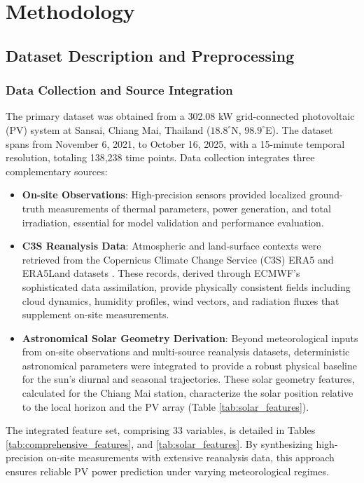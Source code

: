 \documentclass[conference]{IEEEtran}
\begin{document}
	
	
	\section{Methodology}
	
	\subsection{Dataset Description and Preprocessing}
	
	\subsubsection{\textbf{Data Collection and Source Integration}}
	The primary dataset was obtained from a 302.08 kW grid-connected photovoltaic (PV) system at Sansai, Chiang Mai, Thailand ($18.8^\circ$N, $98.9^\circ$E). The dataset spans from November 6, 2021, to October 16, 2025, with a 15-minute temporal resolution, totaling 138,238 time points. Data collection integrates three complementary sources:
	
	\begin{itemize} 
		\item \textbf{On-site Observations}: High-precision sensors provided localized ground-truth measurements of thermal parameters, power generation, and total irradiation, essential for model validation and performance evaluation. 
		\item \textbf{C3S Reanalysis Data}: Atmospheric and land-surface contexts were retrieved from the Copernicus Climate Change Service (C3S) ERA5 and ERA5Land datasets \cite{Copernicus2023, Hersbach2023, CopernicusLand2019, MunozSabater2019}. These records, derived through ECMWF's sophisticated data assimilation, provide physically consistent fields including cloud dynamics, humidity profiles, wind vectors, and radiation fluxes that supplement on-site measurements. 
		\item \textbf{Astronomical Solar Geometry Derivation}: Beyond meteorological inputs from on-site observations and multi-source reanalysis datasets, deterministic astronomical parameters were integrated to provide a robust physical baseline for the sun’s diurnal and seasonal trajectories. These solar geometry features, calculated for the Chiang Mai station, characterize the solar position relative to the local horizon and the PV array (Table \ref{tab:solar_features}).
	\end{itemize}
	
	The integrated feature set, comprising 33 variables, is detailed in Tables \ref{tab:comprehensive_features}, and \ref{tab:solar_features}. By synthesizing high-precision on-site measurements with extensive reanalysis data, this approach ensures reliable PV power prediction under varying meteorological regimes.
		
\end{document}
